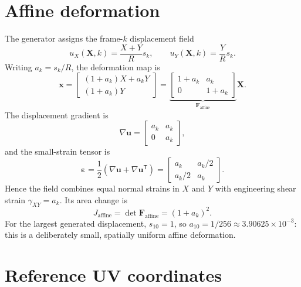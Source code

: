 \documentclass[11pt,a4paper]{article}
\begin{document}
\section{Affine deformation}

The generator assigns the frame-$k$ displacement field
\begin{equation}
  u_X(\mathbf{X},k)=\frac{X+Y}{R}s_k,
  \qquad
  u_Y(\mathbf{X},k)=\frac{Y}{R}s_k.
\end{equation}
Writing $a_k=s_k/R$, the deformation map is
\begin{equation}
  \mathbf{x}
  = \begin{bmatrix}
      (1+a_k)X+a_kY\\
      (1+a_k)Y
    \end{bmatrix}
  = \underbrace{\begin{bmatrix}
      1+a_k & a_k\\
      0 & 1+a_k
    \end{bmatrix}}_{\mathbf{F}_{\mathrm{affine}}}
    \mathbf{X}.
\end{equation}
The displacement gradient is
\begin{equation}
  \nabla\mathbf{u}
  = \begin{bmatrix}a_k & a_k\\0 & a_k\end{bmatrix},
\end{equation}
and the small-strain tensor is
\begin{equation}
  \boldsymbol{\varepsilon}
  = \frac{1}{2}\left(\nabla\mathbf{u}+\nabla\mathbf{u}^{\mathsf T}\right)
  = \begin{bmatrix}a_k & a_k/2\\a_k/2 & a_k\end{bmatrix}.
\end{equation}
Hence the field combines equal normal strains in $X$ and $Y$ with engineering
shear strain $\gamma_{XY}=a_k$.  Its area change is
\begin{equation}
  J_{\mathrm{affine}}=\det\mathbf{F}_{\mathrm{affine}}=(1+a_k)^2.
\end{equation}
For the largest generated displacement, $s_{10}=1$, so
$a_{10}=1/256\approx3.90625\times10^{-3}$: this is a deliberately small,
spatially uniform affine deformation.

\section{Reference UV coordinates}
\end{document}
